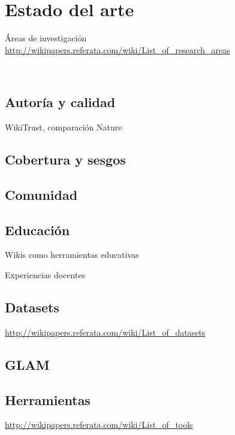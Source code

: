 \documentclass[11pt,onecolumn]{article}
\begin{document}
\section{Estado del arte}

Áreas de investigación \href{http://wikipapers.referata.com/wiki/List_of_research_areas}{http://wikipapers.referata.com/wiki/List\_of\_research\_areas}

~\citep{okoli2009}
~\citep{martin2011}
~\citep{voss2005}
~\citep{okoli2009b}
~\citep{ayers2006}
~\citep{okoli2012}
~\citep{jullien2012}
~\citep{nielsen2011}


\subsection{Autoría y calidad}

WikiTrust, comparación Nature


\subsection{Cobertura y sesgos}


\subsection{Comunidad}


\subsection{Educación}


Wikis como herramientas educativas

Experiencias docentes

\subsection{Datasets}

\href{http://wikipapers.referata.com/wiki/List_of_datasets}{http://wikipapers.referata.com/wiki/List\_of\_datasets}


\subsection{GLAM}


\subsection{Herramientas}

\href{http://wikipapers.referata.com/wiki/List_of_tools}{http://wikipapers.referata.com/wiki/List\_of\_tools}
\end{document}
